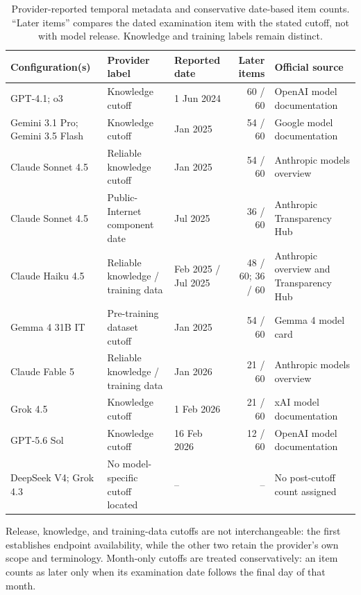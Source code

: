 \documentclass[11pt,a4paper,twocolumn]{article}
\begin{document}
\begin{table}[!t]
\centering
\caption{Provider-reported temporal metadata and conservative date-based item counts.
``Later items'' compares the dated examination item with the stated cutoff,
not with model release. Knowledge and training labels remain distinct.}
\label{tab:cutoffs}
\footnotesize
\setlength{\tabcolsep}{3.5pt}
\renewcommand{\arraystretch}{1.05}
\begin{tabularx}{\textwidth}{P{3.2cm}P{3.25cm}P{2.55cm}rY}
\toprule
\textbf{Configuration(s)} & \textbf{Provider label} & \textbf{Reported date} &
\textbf{Later items} & \textbf{Official source} \\
\midrule
GPT-4.1; o3 & Knowledge cutoff & 1 Jun 2024 & 60 / 60 & OpenAI model documentation \citep{openai2026gpt41,openai2026o3} \\
Gemini 3.1 Pro; Gemini 3.5 Flash & Knowledge cutoff & Jan 2025 & 54 / 60 & Google model documentation \citep{google2026gemini3,google2026gemini35} \\
Claude Sonnet 4.5 & Reliable knowledge cutoff & Jan 2025 & 54 / 60 & Anthropic models overview \citep{anthropic2026models} \\
Claude Sonnet 4.5 & Public-Internet component date & Jul 2025 & 36 / 60 & Anthropic Transparency Hub \citep{anthropic2026transparency} \\
Claude Haiku 4.5 & Reliable knowledge / training data & Feb 2025 / Jul 2025 & 48 / 60; 36 / 60 & Anthropic overview and Transparency Hub \citep{anthropic2026models,anthropic2026transparency} \\
Gemma 4 31B IT & Pre-training dataset cutoff & Jan 2025 & 54 / 60 & Gemma 4 model card \citep{google2026gemma4} \\
Claude Fable 5 & Reliable knowledge / training data & Jan 2026 & 21 / 60 & Anthropic models overview \citep{anthropic2026models} \\
Grok 4.5 & Knowledge cutoff & 1 Feb 2026 & 21 / 60 & xAI model documentation \citep{xai2026grok45} \\
GPT-5.6 Sol & Knowledge cutoff & 16 Feb 2026 & 12 / 60 & OpenAI model documentation \citep{openai2026gpt56} \\
DeepSeek V4; Grok 4.3 & No model-specific cutoff located & -- & -- & No post-cutoff count assigned \\
\bottomrule
\end{tabularx}
\end{table}

Release, knowledge, and training-data cutoffs are not interchangeable: the
first establishes endpoint availability, while the other two retain the
provider's own scope and terminology. Month-only cutoffs are treated
conservatively: an item counts as later only when its examination date follows
the final day of that month.
\end{document}
